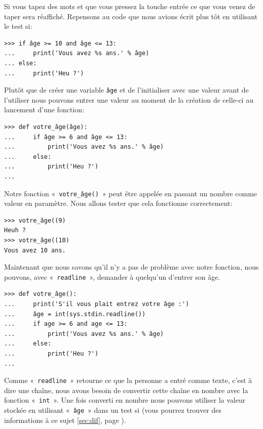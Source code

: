 Si vous tapez des mots et que vous pressez la touche entrée ce que vous venez de taper sera réaffiché. Repensons au code que nous avions écrit plus tôt en utilisant le test si:

\begin{Verbatim}[frame=single,rulecolor=\color{gray}, label=ne pas saisir]
>>> if âge >= 10 and âge <= 13:
...     print('Vous avez %s ans.' % âge)
... else:
...     print('Heu ?')
\end{Verbatim}

Plutôt que de créer une variable \texttt{âge} et de l'initialiser avec une valeur avant de l'utiliser nous pouvons  entrer une valeur au moment de la création de celle-ci au lancement d'une fonction:

\begin{Verbatim}[frame=single,rulecolor=\color{mbleu}, label=à taper]
>>> def votre_âge(âge):
...     if âge >= 6 and âge <= 13:
...         print('Vous avez %s ans.' % âge)
...     else:
...         print('Heu ?')
...
\end{Verbatim}

Notre fonction «~\texttt{votre\_âge()}~» peut être appelée en passant un nombre comme valeur en paramètre. Nous allons tester que cela fonctionne correctement: 

\begin{Verbatim}[frame=single,rulecolor=\color{mbleu}, label=à taper]
>>> votre_âge((9)
Heuh ?
>>> votre_âge((10)
Vous avez 10 ans.
\end{Verbatim}

Maintenant que nous savons qu'il n'y a pas de problème avec notre fonction, nous pouvons,
avec «~\texttt{readline}~», demander à quelqu'un d'entrer son âge.


\begin{Verbatim}[frame=single,rulecolor=\color{mbleu}, label=à taper]
>>> def votre_âge():
...     print('S'il vous plait entrez votre âge :')
...     âge = int(sys.stdin.readline())
...     if age >= 6 and age <= 13:
...         print('Vous avez %s ans.' % âge)
...     else:
...         print('Heu ?')
...
\end{Verbatim}

Comme «~\texttt{readline}~» retourne ce que la personne a entré comme texte, c'est à dire une chaîne, nous avons besoin de convertir cette chaîne en nombre avec la fonction «~\texttt{int}~». Une fois converti en nombre nous pouvons utiliser la valeur stockée en utilisant «~\texttt{âge}~» dans un test si (vous pourrez trouver des informations à ce sujet \autoref{sec:dif}, page \pageref{sec:dif}).

